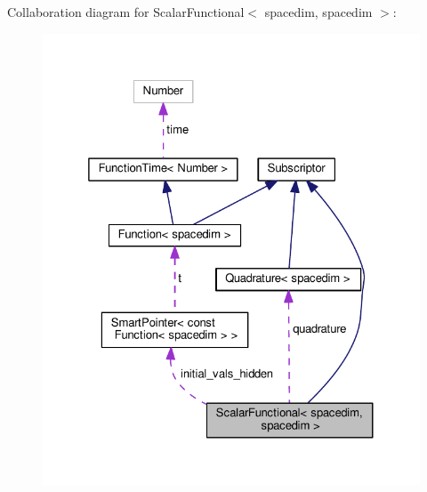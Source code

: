 Collaboration diagram for Scalar\+Functional$<$ spacedim, spacedim $>$\+:
\nopagebreak
\begin{figure}[H]
\begin{center}
\leavevmode
\includegraphics[width=325pt]{class_scalar_functional_3_01spacedim_00_01spacedim_01_4__coll__graph}
\end{center}
\end{figure}
